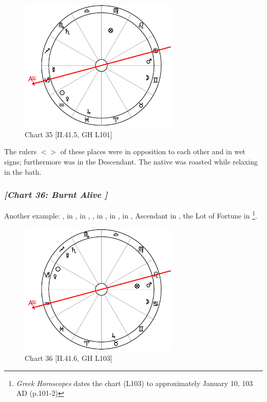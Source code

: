 \clearpage
\begin{figure}
\centering
\vspace{-20pt}
\includegraphics[width=0.68\textwidth]{charts/2_41_5}
\caption{Chart 35 [II.41.5, GH L101]}
\label{fig:chart35}
\end{figure}

The rulers $<$\Mars\xspace \Mercury$>$ of these places were in opposition to each other and in wet signs; furthermore \Mars\xspace was in the Descendant. The native was roasted while relaxing in the bath. 
\newpage
\subsubsection{\textit{[Chart 36: Burnt Alive ]}}
Another example: \Sun, \Venus\xspace in \Capricorn, \Moon\xspace in \Cancer, \Saturn, \Mercury\xspace in \Sagittarius, \Jupiter\xspace in \Taurus, \Mars\xspace in \Leo, Ascendant in \Aquarius, the Lot of Fortune in \Leo
\footnote{\textit{Greek Horoscopes} dates the chart (L103) to approximately January 10, 103 AD (p.101-2)}.

\clearpage
\begin{figure}
\centering
\vspace{-20pt}
\includegraphics[width=0.68\textwidth]{charts/2_41_6}
\caption{Chart 36 [II.41.6, GH L103]}
\label{fig:chart36}
\end{figure}

